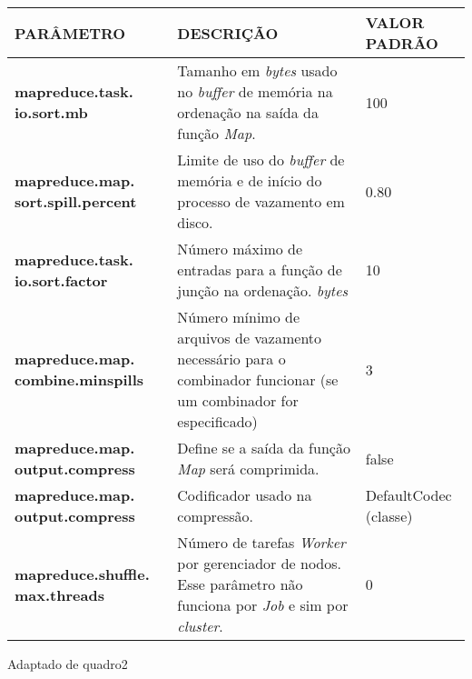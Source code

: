 {\footnotesize
  \centering
  \begin{tabular}{|p{30mm}|p{50mm}|p{35mm}|}\hline
    \textbf{PARÂMETRO}                         & \textbf{DESCRIÇÃO}                                                                                                                   & \textbf{VALOR PADRÃO} \\\hline
    \textbf{mapreduce.task. io.sort.mb}        & Tamanho em \textit{bytes} usado no \textit{buffer} de memória na ordenação na saída da função \textit{Map}.                          & 100                   \\\hline
    \textbf{mapreduce.map. sort.spill.percent} & Limite de uso do \textit{buffer} de memória e de início do processo de vazamento em disco.                                           & 0.80                  \\\hline
    \textbf{mapreduce.task. io.sort.factor}    & Número máximo de entradas para a função de junção na ordenação. \textit{bytes}                                                       & 10                    \\\hline
    \textbf{mapreduce.map. combine.minspills}  & Número mínimo de arquivos de vazamento necessário para o combinador funcionar (se um combinador for especificado)                    & 3                     \\\hline
    \textbf{mapreduce.map. output.compress}    & Define se a saída da função \textit{Map} será comprimida.                                                                            & false                 \\\hline
    \textbf{mapreduce.map. output.compress}    & Codificador usado na compressão.                                                                                                     & DefaultCodec (classe) \\\hline
    \textbf{mapreduce.shuffle. max.threads}    & Número de tarefas \textit{Worker} por gerenciador de nodos. Esse parâmetro não funciona por \textit{Job} e sim por \textit{cluster}. & 0                     \\\hline
  \end{tabular}}
{Adaptado de \cite{HadoopBook15}}{quadro2}{}{}

